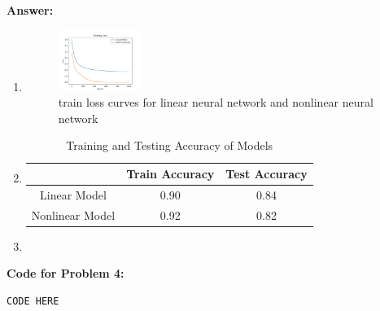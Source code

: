 \documentclass[11pt, oneside]{article}   	%
\begin{document}
\textbf{Answer:} \\
\begin{enumerate}
    \item
    \begin{figure}[ht]
        \centering
        \includegraphics[width=0.25\textwidth]{Trainloss.png}
        \caption{train loss curves for linear neural network and nonlinear neural network}
    \end{figure}
    
    \item
        \begin{table}[h!]
            \centering
                \begin{tabular}{|c|c|c|}
                \hline
                & Train Accuracy & Test Accuracy \\ \hline
                Linear Model & 0.90 & 0.84 \\ \hline
                Nonlinear Model & 0.92 & 0.82 \\ \hline
                \end{tabular}
            \caption{Training and Testing Accuracy of Models}
        \end{table}
    \item 
\end{enumerate}



\textbf{Code for Problem 4:} \\
\begin{verbatim}
CODE HERE
\end{verbatim}
\end{document}
